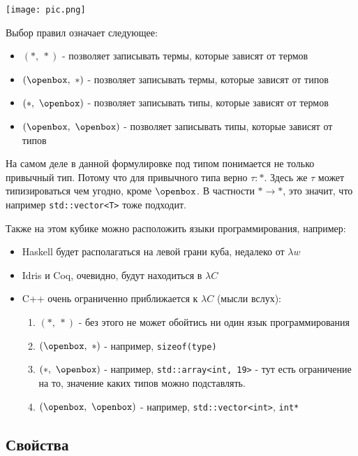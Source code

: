 \begin{center}
    {\texttt{[image: pic.png]}}
\end{center}

Выбор правил означает следующее:
\begin{itemize}
    \item $(*,\ *)$ - позволяет записывать термы, которые зависят от термов
    \item $(\openbox,\ *)$ - позволяет записывать термы, которые зависят от типов
    \item $(*,\ \openbox)$ - позволяет записывать типы, которые зависят от термов
    \item $(\openbox,\ \openbox)$ - позволяет записывать типы, которые зависят от типов
\end{itemize}

На самом деле в данной формулировке под типом понимается не только привычный тип. Потому что для привычного типа верно $\tau : *$. Здесь же $\tau$ может типизироваться чем угодно, кроме $\openbox$. В частности $* \rightarrow *$, это значит, что например \texttt{std::vector<T>} тоже подходит.

Также на этом кубике можно расположить языки программирования, например:
\begin{itemize}
    \item Haskell будет располагаться на левой грани куба, недалеко от $\lambda w$
    \item Idris и Coq, очевидно, будут находиться в $\lambda C$
    \item C++ очень ограниченно приближается к $\lambda C$ (мысли вслух):
    \begin{enumerate}
        \item $(*,\ *)$ - без этого не может обойтись ни один язык программирования
        \item $(\openbox,\ *)$ - например, \texttt{sizeof(type)}
        \item $(*,\ \openbox)$ - например, \texttt{std::array<int, 19>} - тут есть ограничение на то, значение каких типов можно подставлять.
        \item $(\openbox,\ \openbox)$ - например, \texttt{std::vector<int>}, \texttt{int*}
    \end{enumerate}
\end{itemize}

\subsection{Свойства}

